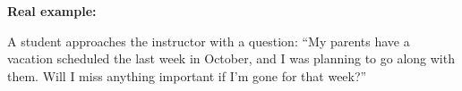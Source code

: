 \vfil \eject
\noindent
{\bf Real example:} 

A student approaches the instructor with a question: ``My parents have a vacation scheduled the last week in October, and I was planning to go along with them.  Will I miss anything important if I'm gone for that week?''











